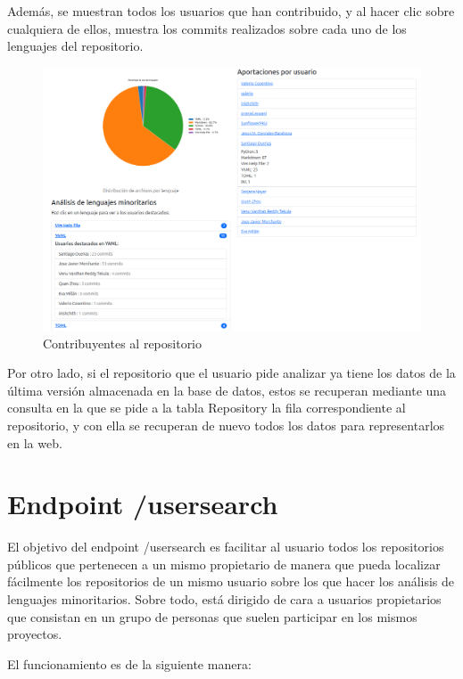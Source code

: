 \documentclass[a4paper, 12pt]{book}
\begin{document}
Además, se muestran todos los usuarios que han contribuido, y al hacer clic sobre cualquiera de ellos, muestra los commits realizados sobre cada uno de los lenguajes del repositorio.
\begin{figure}[H]
  \centering
  \includegraphics[width=1\textwidth]{img/resultado3userrepo.png}
  \caption{Contribuyentes al repositorio}
  \label{figura:resultuserrepo3}
\end{figure}
Por otro lado, si el repositorio que el usuario pide analizar ya tiene los datos de la última versión almacenada en la base de datos, estos se recuperan mediante una consulta en la que se pide a la tabla Repository la fila correspondiente al repositorio, y con ella se recuperan de nuevo todos los datos para representarlos en la web.

\section{Endpoint /usersearch}
\label{sec:/usersearch}

El objetivo del endpoint /usersearch es facilitar al usuario todos los repositorios públicos que pertenecen a un mismo propietario de manera que pueda localizar fácilmente los repositorios de un mismo usuario sobre los que hacer los análisis de lenguajes minoritarios. Sobre todo, está dirigido de cara a usuarios propietarios que consistan en un grupo de personas que suelen participar en los mismos proyectos.

El funcionamiento es de la siguiente manera:
\end{document}
